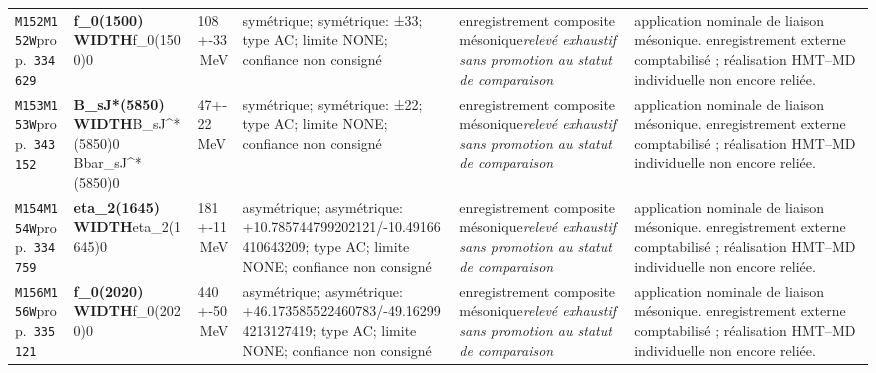 \begin{landscape}
\begin{longtable}{L{1.85cm}L{4.45cm}L{2.35cm}L{4.05cm}L{3.35cm}L{7.15cm}}
\texttt{M152}\newline \texttt{M152W}\newline prop.\ \texttt{334629} & \textbf{f\_\allowbreak{}0(1500) WIDTH}\newline f\_\allowbreak{}0(1500)0 & 108+-33\,MeV & symétrique; symétrique: ±33; type AC; limite NONE; confiance non consigné & enregistrement composite mésonique\newline \emph{relevé exhaustif sans promotion au statut de comparaison} & application nominale de liaison mésonique. enregistrement externe comptabilisé ; réalisation HMT--MD individuelle non encore reliée. \\
\texttt{M153}\newline \texttt{M153W}\newline prop.\ \texttt{343152} & \textbf{B\_\allowbreak{}sJ*(5850) WIDTH}\newline B\_\allowbreak{}sJ\textasciicircum{}*(5850)0 \textbar{}\allowbreak{} Bbar\_\allowbreak{}sJ\textasciicircum{}*(5850)0 & 47+-22\,MeV & symétrique; symétrique: ±22; type AC; limite NONE; confiance non consigné & enregistrement composite mésonique\newline \emph{relevé exhaustif sans promotion au statut de comparaison} & application nominale de liaison mésonique. enregistrement externe comptabilisé ; réalisation HMT--MD individuelle non encore reliée. \\
\texttt{M154}\newline \texttt{M154W}\newline prop.\ \texttt{334759} & \textbf{eta\_\allowbreak{}2(1645) WIDTH}\newline eta\_\allowbreak{}2(1645)0 & 181+-11\,MeV & asymétrique; asymétrique: +10.785744799202121/-10.49166410643209; type AC; limite NONE; confiance non consigné & enregistrement composite mésonique\newline \emph{relevé exhaustif sans promotion au statut de comparaison} & application nominale de liaison mésonique. enregistrement externe comptabilisé ; réalisation HMT--MD individuelle non encore reliée. \\
\texttt{M156}\newline \texttt{M156W}\newline prop.\ \texttt{335121} & \textbf{f\_\allowbreak{}0(2020) WIDTH}\newline f\_\allowbreak{}0(2020)0 & 440+-50\,MeV & asymétrique; asymétrique: +46.173585522460783/-49.162994213127419; type AC; limite NONE; confiance non consigné & enregistrement composite mésonique\newline \emph{relevé exhaustif sans promotion au statut de comparaison} & application nominale de liaison mésonique. enregistrement externe comptabilisé ; réalisation HMT--MD individuelle non encore reliée. \\

\end{longtable}
\end{landscape}
